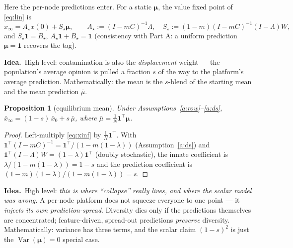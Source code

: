 \documentclass[11pt]{article}
\newtheorem{proposition}{Proposition}
\theoremstyle{definition}
\newcommand{\one}{\mathbf{1}}
\DeclareMathOperator{\Var}{Var}
\newcommand{\idea}[1]{\par\medskip\noindent\textbf{Idea.}\ #1\par\medskip}
\begin{document}
Here the per-node predictions enter. For a static $\bm{\mu}$, the value fixed point of
\eqref{eq:lin} is
\begin{equation}\label{eq:xinf}
x_\infty=A_\star x(0)+S_\star\bm{\mu},\qquad
A_\star:=(I-mC)^{-1}\Lambda,\quad
S_\star:=(1-m)(I-mC)^{-1}(I-\Lambda)W,
\end{equation}
and $S_\star\one=B_\star$, $A_\star\one+B_\star=\one$ (consistency with Part A: a uniform
prediction $\bm{\mu}=\one$ recovers the tag).

\idea{High level: contamination is also the \emph{displacement} weight --- the
population's average opinion is pulled a fraction $s$ of the way to the platform's
average prediction. Mathematically: the mean is the $s$-blend of the starting mean and
the mean prediction $\bar\mu$.}

\begin{proposition}[equilibrium mean]\label{prop:mean}
Under Assumptions~\ref{a:row}--\ref{a:ds}, $\bar x_\infty=(1-s)\,\bar x_0+s\,\bar\mu$,
where $\bar\mu=\tfrac1N\one^{\!\top}\bm{\mu}$.
\end{proposition}
\begin{proof}
Left-multiply \eqref{eq:xinf} by $\tfrac1N\one^{\!\top}$. With $\one^{\!\top}(I-mC)^{-1}
=\one^{\!\top}/(1-m(1-\lambda))$ (Assumption~\ref{a:ds}) and $\one^{\!\top}(I-\Lambda)W
=(1-\lambda)\one^{\!\top}$ (doubly stochastic), the innate coefficient is
$\lambda/(1-m(1-\lambda))=1-s$ and the prediction coefficient is
$(1-m)(1-\lambda)/(1-m(1-\lambda))=s$.
\end{proof}

\idea{High level: \emph{this is where ``collapse'' really lives, and where the scalar
model was wrong.} A per-node platform does not squeeze everyone to one point --- it
\emph{injects its own prediction-spread}. Diversity dies only if the predictions
themselves are concentrated; feature-driven, spread-out predictions \emph{preserve}
diversity. Mathematically: variance has three terms, and the scalar claim $(1-s)^2$ is
just the $\Var(\bm{\mu})=0$ special case.}
\end{document}
